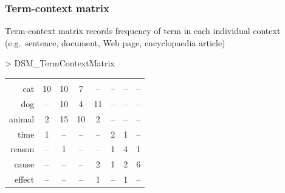 \documentclass[t]{beamer} %
\begin{document}
\begin{frame}[fragile]
  \frametitle{Term-context matrix}

  \h{Term-context matrix} records frequency of term in each individual context (e.g.\ sentence, document, Web page, encyclopaedia article)
\begin{Rcode}
> DSM_TermContextMatrix
\end{Rcode}
  
  \gap[2]
  \begin{center}
  \begin{small}
    \setlength{\arrayrulewidth}{1pt}
    \begin{tabular}[c]{r*{7}{|c}|}
      & 
      & 
      & 
      & 
      & 
      & 
      &  \\
      cat      &      10 &  10 &     7 &    -- &         -- &   -- &        -- \\
      dog      &      -- &  10 &     4 &    11 &         -- &   -- &        -- \\
      animal   &       2 &  15 &    10 &     2 &         -- &   -- &        -- \\
      time     &       1 &  -- &    -- &    -- &          2 &    1 &        -- \\
      reason   &      -- &   1 &    -- &    -- &          1 &    4 &         1 \\
      cause    &      -- &  -- &    -- &     2 &          1 &    2 &         6 \\
      effect   &      -- &  -- &    -- &     1 &         -- &    1 &        -- \\
    \end{tabular}
  \end{small}
  \end{center}

\end{frame}
\end{document}
